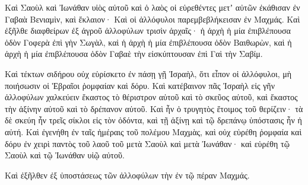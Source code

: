 {Καὶ Σαοὺλ καὶ Ἰωνάθαν υἱὸς αὐτοῦ καὶ ὁ λαὸς οἱ εὑρεθέντες μετʼ αὐτῶν ἐκάθισαν ἐν Γαβαὰ Βενιαμὶν, καὶ ἔκλαιον· Καὶ οἱ ἀλλόφυλοι παρεμβεβλήκεισαν ἐν Μαχμάς.
Καὶ ἐξῆλθε διαφθείρων ἐξ ἀγροῦ ἀλλοφύλων τρισὶν ἀρχαῖς· ἡ ἀρχὴ ἡ μία ἐπιβλέπουσα ὁδὸν Γοφερὰ ἐπὶ γὴν Σωγὰλ,
καὶ ἡ ἀρχὴ ἡ μία ἐπιβλέπουσα ὁδὸν Βαιθωρὼν, καὶ ἡ ἀρχὴ ἡ μία ἐπιβλέπουσα ὁδὸν Γαβαὲ τὴν εἰσκύπτουσαν ἐπὶ Γαὶ τὴν Σαβίμ.
\par }{\PP {}Καὶ τέκτων σιδήρου οὐχ εὑρίσκετο ἐν πάσῃ γῇ Ἰσραὴλ, ὅτι εἶπον οἱ ἀλλόφυλοι, μὴ ποιήσωσιν οἱ Ἑβραῖοι ῥομφαίαν καὶ δόρυ.
Καὶ κατέβαινον πᾶς Ἰσραὴλ εἰς γῆν ἀλλοφύλων χαλκεύειν ἕκαστος τὸ θέριστρον αὐτοῦ καὶ τὸ σκεῦος αὐτοῦ, καὶ ἕκαστος τὴν ἀξίνην αὐτοῦ καὶ τὸ δρέπανον αὐτοῦ.
Καὶ ἦν ὁ τρυγητὸς ἕτοιμος τοῦ θερίζειν· τὰ δὲ σκεύη ἦν τρεῖς σίκλοι εἰς τὸν ὀδόντα, καὶ τῇ ἀξίνῃ καὶ τῷ δρεπάνῳ ὑπόστασις ἦν ἡ αὐτή.
Καὶ ἐγενήθη ἐν ταῖς ἡμέραις τοῦ πολέμου Μαχμὰς, καὶ οὐχ εὑρέθη ῥομφαία καὶ δόρυ ἐν χειρὶ παντὸς τοῦ λαοῦ τοῦ μετὰ Σαοὺλ καὶ μετὰ Ἰωνάθαν· καὶ εὑρέθη τῷ Σαοὺλ καὶ τῷ Ἰωνάθαν υἱῷ αὐτοῦ.
\par }{\PP {}Καὶ ἐξῆλθεν ἐξ ὑποστάσεως τῶν ἀλλοφύλων τὴν ἐν τῷ πέραν Μαχμάς.

}
